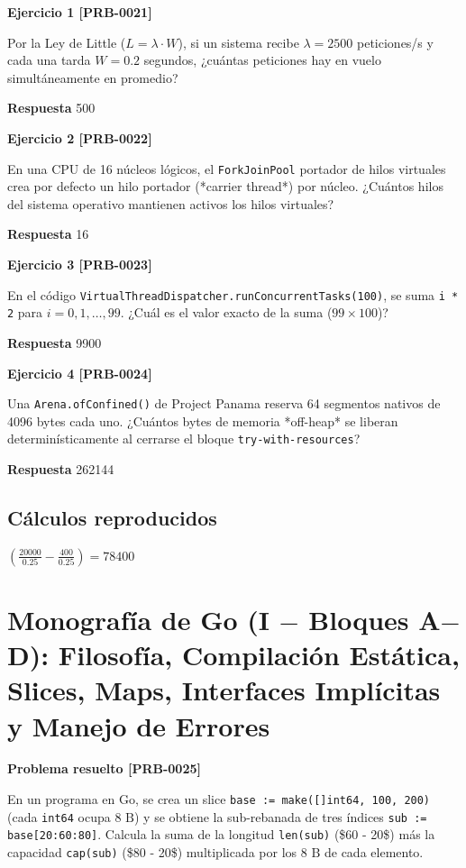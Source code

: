 \documentclass{book}
\begin{document}
\noindent\textbf{Ejercicio 1 [PRB-0021]}

Por la Ley de Little (\(L = \lambda \cdot W\)), si un sistema recibe \(\lambda = 2500\) peticiones/s y cada una tarda \(W = 0.2\) segundos, ¿cuántas peticiones hay en vuelo simultáneamente en promedio?

\noindent\textbf{Respuesta} 500

\noindent\textbf{Ejercicio 2 [PRB-0022]}

En una CPU de 16 núcleos lógicos, el \texttt{ForkJoinPool} portador de hilos virtuales crea por defecto un hilo portador (*carrier thread*) por núcleo. ¿Cuántos hilos del sistema operativo mantienen activos los hilos virtuales?

\noindent\textbf{Respuesta} 16

\noindent\textbf{Ejercicio 3 [PRB-0023]}

En el código \texttt{VirtualThreadDispatcher.runConcurrentTasks(100)}, se suma \texttt{i * 2} para \(i = 0, 1, \dots, 99\). ¿Cuál es el valor exacto de la suma (\(99 \times 100\))?

\noindent\textbf{Respuesta} 9900

\noindent\textbf{Ejercicio 4 [PRB-0024]}

Una \texttt{Arena.ofConfined()} de Project Panama reserva 64 segmentos nativos de 4096 bytes cada uno. ¿Cuántos bytes de memoria *off-heap* se liberan determinísticamente al cerrarse el bloque \texttt{try-with-resources}?

\noindent\textbf{Respuesta} 262144

\subsection*{Cálculos reproducidos}

\(\left(\frac{20000}{0.25}-\frac{400}{0.25}\right) = 78400\)

\section{Monografía de Go (I \(-\) Bloques A\(-\)D): Filosofía, Compilación Estática, Slices, Maps, Interfaces Implícitas y Manejo de Errores}

\noindent\textbf{Problema resuelto [PRB-0025]}

En un programa en Go, se crea un slice \texttt{base := make([]int64, 100, 200)} (cada \texttt{int64} ocupa \(8\text{ B}\)) y se obtiene la sub-rebanada de tres índices \texttt{sub := base[20:60:80]}. Calcula la suma de la longitud \texttt{len(sub)} (\$60 - 20\$) más la capacidad \texttt{cap(sub)} (\$80 - 20\$) multiplicada por los \(8\text{ B}\) de cada elemento.
\end{document}
